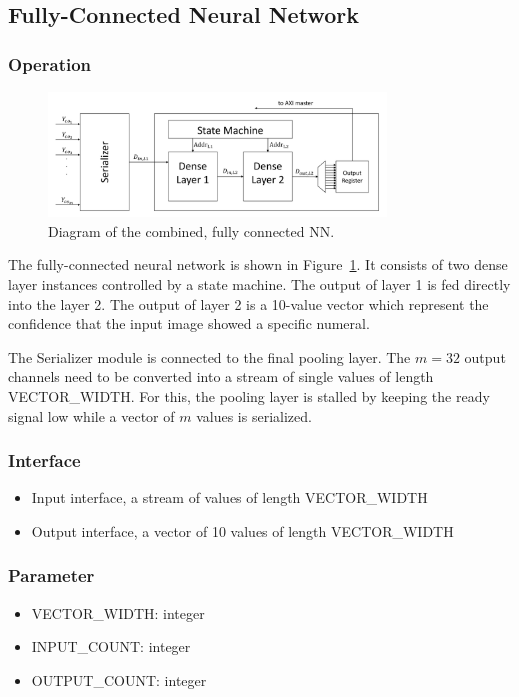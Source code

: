\subsection{Fully-Connected Neural Network}

\subsubsection{Operation}

\begin{figure}[h]
	\centering
	\includegraphics[width=0.8\textwidth]{img/dense.pdf}
	\caption{Diagram of the combined, fully connected NN.}
	\label{FIG:nn}
\end{figure}

The fully-connected neural network is shown in Figure~\ref{FIG:nn}. It consists of two dense layer instances controlled by a state machine. The output of layer 1 is fed directly into the layer 2. The output of layer 2 is a 10-value vector which represent the confidence that the input image showed a specific numeral. 

The Serializer module is connected to the final pooling layer. The $m=32$ output channels need to be converted into a stream of single values of length VECTOR\_WIDTH. For this, the pooling layer is stalled by keeping the ready signal low while a vector of $m$ values is serialized.

\subsubsection{Interface}
\begin{itemize}
	\item Input interface, a stream of values of length VECTOR\_WIDTH
	\item Output interface, a vector of 10 values of length VECTOR\_WIDTH
\end{itemize}
\subsubsection{Parameter}
\begin{itemize}
	\item VECTOR\_WIDTH: integer
	\item INPUT\_COUNT: integer
	\item OUTPUT\_COUNT: integer
\end{itemize}